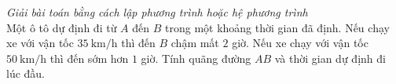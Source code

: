 \begin{ex}%
	\textit{Giải bài toán bằng cách lập phương trình hoặc hệ phương trình}\\
	Một ô tô dự định đi từ $ A $ đến $ B $ trong một khoảng thời gian đã định. Nếu chạy xe với vận tốc $ 35\mathrm{\ km/h} $ thì đến $ B $ chậm mất $ 2 $ giờ. Nếu xe chạy với vận tốc $ 50\mathrm{\ km/h} $ thì đến sớm hơn $ 1 $ giờ. Tính quãng đường $ AB $ và thời gian dự định đi lúc đầu.
\end{ex}

